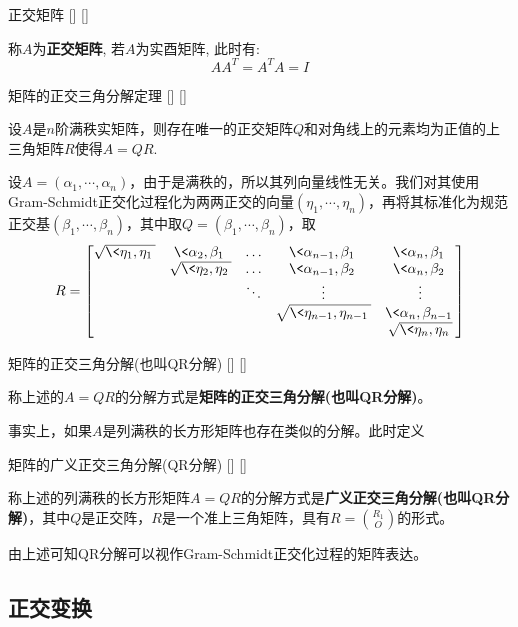 \documentclass[UTF8]{ctexart}
\begin{document}
		\begin{dfn}
			[]
			{正交矩阵}
			[]
			[]

			称$A$为\textbf{正交矩阵}, 若$A$为实酉矩阵, 此时有: \[AA^T=A^T A=I\]
		\end{dfn}

		\begin{thm}
			[]
			{矩阵的正交三角分解定理}
			[]
			[]

			设$A$是$n$阶满秩实矩阵，则存在唯一的正交矩阵$Q$和对角线上的元素均为正值的上三角矩阵$R$使得$A=QR$.
		\end{thm}

		\begin{prf}
			设$A=(\alpha_1,\cdots,\alpha_n)$，由于是满秩的，所以其列向量线性无关。我们对其使用Gram-Schmidt正交化过程化为两两正交的向量$(\eta_1,\cdots,\eta_n)$，再将其标准化为规范正交基$(\beta_1,\cdots,\beta_n)$，其中取$Q=(\beta_1,\cdots,\beta_n)$，取
			\[R=\begin{bmatrix}
				\sqrt{\<\eta_1,\eta_1\>}&\<\alpha_2,\beta_1\>&\ldots&\<\alpha_{n-1},\beta_1\>&\<\alpha_n,\beta_1\>\\
				&\sqrt{\<\eta_2,\eta_2\>}&\ldots&\<\alpha_{n-1},\beta_2\>&\<\alpha_n,\beta_2\>\\
				&&\ddots&\vdots&\vdots\\
				&&&\sqrt{\<\eta_{n-1},\eta_{n-1}\>}&\<\alpha_n,\beta_{n-1}\>\\
				&&&&\sqrt{\<\eta_{n},\eta_{n}\>} 
			\end{bmatrix}
			\]
		\end{prf}

		\begin{dfn}
			[]
			{矩阵的正交三角分解(也叫QR分解)}
			[]
			[]

			称上述的$A=QR$的分解方式是\textbf{矩阵的正交三角分解(也叫QR分解)}。
		\end{dfn}

		事实上，如果$A$是列满秩的长方形矩阵也存在类似的分解。此时定义

		\begin{dfn}
			[]
			{矩阵的广义正交三角分解(QR分解)}
			[]
			[]

			称上述的列满秩的长方形矩阵$A=QR$的分解方式是\textbf{广义正交三角分解(也叫QR分解)}，其中$Q$是正交阵，$R$是一个准上三角矩阵，具有$R=\binom{R_1}{O} $的形式。
		\end{dfn}

		由上述可知QR分解可以视作Gram-Schmidt正交化过程的矩阵表达。

	\subsection{正交变换}
\end{document}
